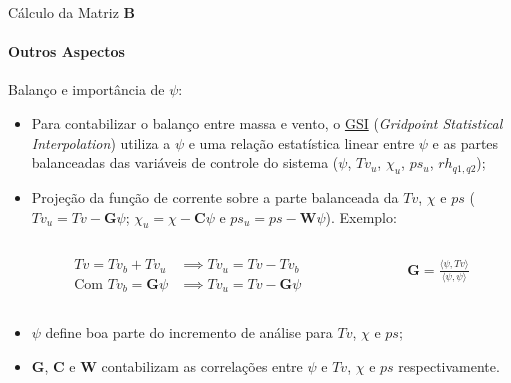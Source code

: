 \documentclass[10pt,aspectratio=169]{beamer}
\begin{document}
\begin{frame}[fragile]{Cálculo da Matriz $\mathbf{B}$}
\framesubtitle{Outros Aspectos}
\begin{block}{Balanço e importância de $\psi$:}
\begin{itemize}
	\item Para contabilizar o balanço entre massa e vento, o \href{https://dtcenter.org/community-code/gridpoint-statistical-interpolation-gsi}{GSI} (\textit{Gridpoint Statistical Interpolation}) utiliza a $\psi$ e uma relação estatística linear entre $\psi$ e as partes balanceadas das variáveis de controle do sistema ($\psi$, $Tv_{u}$, $\chi_{u}$, $ps_{u}$, $rh_{q1,q2}$);
	\pause
	\item Projeção da função de corrente sobre a parte balanceada da $Tv$, $\chi$ e $ps$ ($Tv_{u} = Tv - \mathbf{G}\psi$; $\chi_{u} = \chi - \mathbf{C}\psi$ e $ps_{u} = ps - \mathbf{W}\psi$). Exemplo:
	\begin{columns}
    	\begin{column}{0.1\textwidth} 
			\begin{align*}
				Tv = Tv_{b} + Tv_{u} &\implies Tv_{u} = Tv - Tv_{b} \\
                \text{Com  } Tv_{b} = \mathbf{G}\psi &\implies Tv_{u} = Tv - \mathbf{G}\psi
			\end{align*}
		\end{column}
		\begin{column}{0.1\textwidth} 
			\begin{align*}
				\mathbf{G} = \frac{\langle\psi, Tv\rangle}{\langle\psi, \psi\rangle}
			\end{align*}
		\end{column}
	\end{columns}	
  \vspace{1em}
	\pause
	\item $\psi$ define boa parte do incremento de análise para $Tv$, $\chi$ e $ps$;
	\pause
	\item $\mathbf{G}$, $\mathbf{C}$ e $\mathbf{W}$ contabilizam as correlações entre $\psi$ e $Tv$, $\chi$ e $ps$ respectivamente.
	\end{itemize}
\end{block}
\end{frame}
\end{document}
